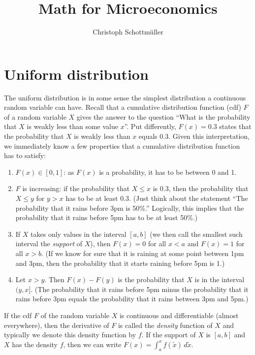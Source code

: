 \documentclass[a4paper,12pt]{article}
\title{Math for Microeconomics}
\author{Christoph Schottm\"uller}
\theoremstyle{plain}
\begin{document}
\maketitle

\section{Uniform distribution}
\label{sec:uniform-distribution}

The uniform distribution is in some sense the simplest distribution a continuous random variable can have. Recall that a cumulative distribution function (cdf) $F$ of a random variable $X$ gives the answer to the question ``What is the probability that  $X$ is weakly less than some value $x$''. Put differently, $F(x)=0.3$ states that the probability that $X$ is weakly less than $x$ equals $0.3$. Given this interpretation, we immediately know a few properties that a cumulative distribution function has to satisfy:
\begin{enumerate}
\item $F(x)\in[0,1]$: as $F(x)$ is a probability, it has to be between 0 and 1.
\item $F$ is increasing: if the probability that $X\leq x$ is $0.3$, then the probability that $X\leq y$ for $y>x$ has to be at least $0.3$. (Just think about the statement ``The probability that it rains before 3pm is 50\%.'' Logically, this implies that the probability that it rains before 5pm has to be at least 50\%.)
\item If $X$ takes only values in the interval $[a,b]$ (we then call the smallest such interval the \emph{support} of $X$), then $F(x)=0$ for all $x<a$ and $F(x)=1$ for all $x>b$. (If we know for sure that it is raining at some point between 1pm and 3pm, then the probability that it starts raining before 5pm is 1.) 
  \item Let $x>y$. Then $F(x)-F(y)$ is the probability that $X$ is in the interval $(y,x]$. (The probability that it rains before 5pm minus the probability that it rains before 3pm equals the probability that it rains between 3pm and 5pm.)
\end{enumerate}

If the cdf $F$ of the random variable $X$ is continuous and differentiable (almost everywhere), then the derivative of $F$ is called the \emph{density} function of $X$ and typically we denote this density function by $f$. If the support of $X$ is $[a,b]$ and $X$ has the density $f$, then we can write $F(x)=\int_{a}^xf(\tilde x)\,d\tilde{x}$.
\end{document}
